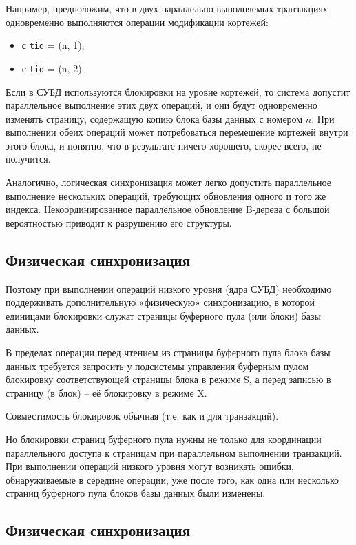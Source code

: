\documentclass[a4paper,12pt]{article}
\begin{document}
Например, предположим, что в двух параллельно выполняемых транзакциях одновременно выполняются операции модификации кортежей:
\begin{itemize}
    \item с \texttt{tid} = (n, 1),
    \item с \texttt{tid} = (n, 2).
\end{itemize}

Если в СУБД используются блокировки на уровне кортежей, то система допустит параллельное выполнение этих двух операций, и они будут одновременно изменять страницу, содержащую копию блока базы данных с номером $n$. При выполнении обеих операций может потребоваться перемещение кортежей внутри этого блока, и понятно, что в результате ничего хорошего, скорее всего, не получится.

Аналогично, логическая синхронизация может легко допустить параллельное выполнение нескольких операций, требующих обновления одного и того же индекса. Некоординированное параллельное обновление B-дерева с большой вероятностью приводит к разрушению его структуры.

\subsection{Физическая синхронизация}

Поэтому при выполнении операций низкого уровня (ядра СУБД) необходимо поддерживать дополнительную «физическую» синхронизацию, в которой единицами блокировки служат страницы буферного пула (или блоки) базы данных.

В пределах операции перед чтением из страницы буферного пула блока базы данных требуется запросить у подсистемы управления буферным пулом блокировку соответствующей страницы блока в режиме S, а перед записью в страницу (в блок) – её блокировку в режиме X.

Совместимость блокировок обычная (т.е. как и для транзакций).

Но блокировки страниц буферного пула нужны не только для координации параллельного доступа к страницам при параллельном выполнении транзакций. При выполнении операций низкого уровня могут возникать ошибки, обнаруживаемые в середине операции, уже после того, как одна или несколько страниц буферного пула блоков базы данных были изменены.

\subsection{Физическая синхронизация}
\end{document}

